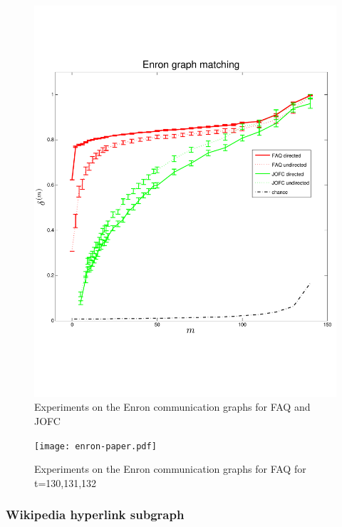 \documentclass[12pt,oneside,final]{thesis}\usepackage[]{graphicx}\usepackage[]{color}
\begin{document}
\begin{figure}
\includegraphics[scale=0.75]{enron-JOFC-FAQ-paper.pdf}
\caption{Experiments on the Enron communication graphs for FAQ and JOFC \label{enron_graphmatch_faq_jofc}}
\end{figure}


\begin{figure}
\texttt{[image: enron-paper.pdf]}
\caption{Experiments on the Enron communication graphs for FAQ for t=130,131,132 \label{enron_graphmatch_faq_t}}
\end{figure}

\subsubsection{Wikipedia hyperlink subgraph}
\end{document}
